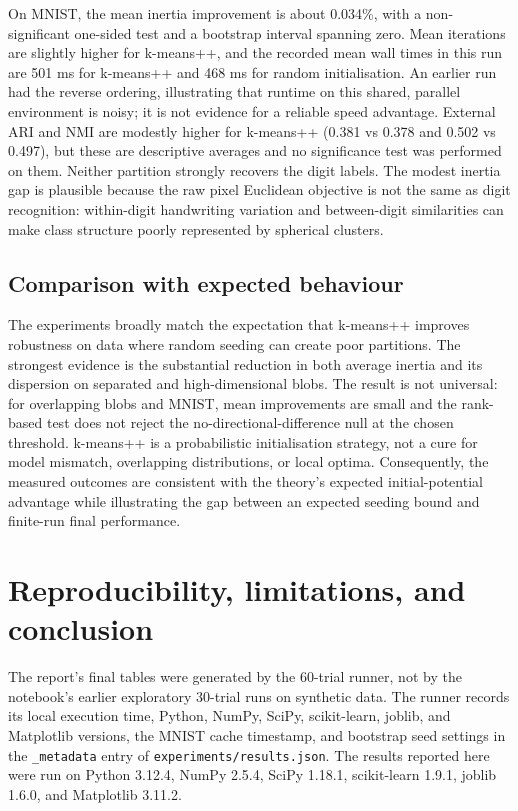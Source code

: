 \documentclass[10pt,a4paper]{article}
\begin{document}
On MNIST, the mean inertia improvement is about 0.034\%, with a non-significant one-sided test and a bootstrap interval spanning zero. Mean iterations are slightly higher for k-means++, and the recorded mean wall times in this run are 501 ms for k-means++ and 468 ms for random initialisation. An earlier run had the reverse ordering, illustrating that runtime on this shared, parallel environment is noisy; it is not evidence for a reliable speed advantage. External ARI and NMI are modestly higher for k-means++ (0.381 vs 0.378 and 0.502 vs 0.497), but these are descriptive averages and no significance test was performed on them. Neither partition strongly recovers the digit labels. The modest inertia gap is plausible because the raw pixel Euclidean objective is not the same as digit recognition: within-digit handwriting variation and between-digit similarities can make class structure poorly represented by spherical clusters.

\subsection{Comparison with expected behaviour}
The experiments broadly match the expectation that k-means++ improves robustness on data where random seeding can create poor partitions. The strongest evidence is the substantial reduction in both average inertia and its dispersion on separated and high-dimensional blobs. The result is not universal: for overlapping blobs and MNIST, mean improvements are small and the rank-based test does not reject the no-directional-difference null at the chosen threshold. k-means++ is a probabilistic initialisation strategy, not a cure for model mismatch, overlapping distributions, or local optima. Consequently, the measured outcomes are consistent with the theory's expected initial-potential advantage while illustrating the gap between an expected seeding bound and finite-run final performance.

\section{Reproducibility, limitations, and conclusion}
The report's final tables were generated by the 60-trial runner, not by the notebook's earlier exploratory 30-trial runs on synthetic data. The runner records its local execution time, Python, NumPy, SciPy, scikit-learn, joblib, and Matplotlib versions, the MNIST cache timestamp, and bootstrap seed settings in the \texttt{\_metadata} entry of \texttt{experiments/results.json}. The results reported here were run on Python 3.12.4, NumPy 2.5.4, SciPy 1.18.1, scikit-learn 1.9.1, joblib 1.6.0, and Matplotlib 3.11.2.
\end{document}
